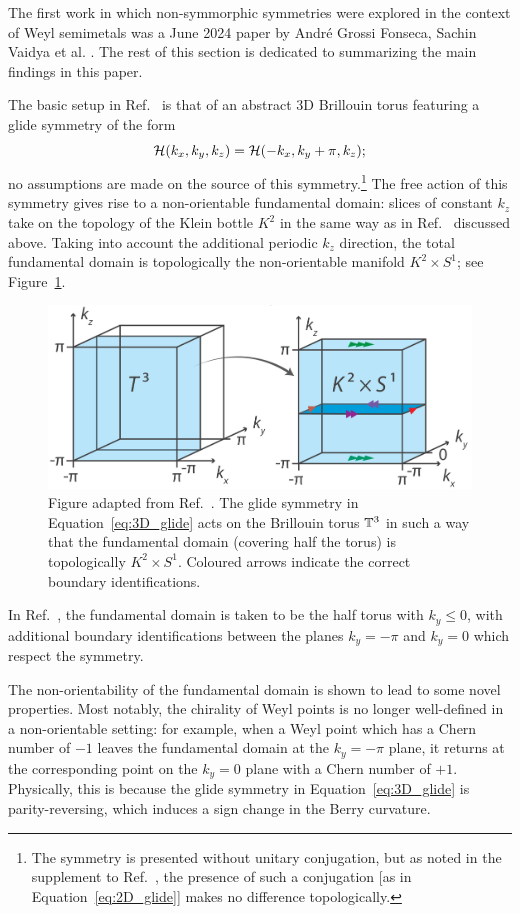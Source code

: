 The first work in which non-symmorphic symmetries were explored in the context of Weyl semimetals was a June 2024 paper by André Grossi Fonseca, Sachin Vaidya et al. \cite{Fonseca-Vaidya_nonorientable}. The rest of this section is dedicated to summarizing the main findings in this paper.

The basic setup in Ref.~\cite{Fonseca-Vaidya_nonorientable} is that of an abstract 3D Brillouin torus featuring a glide symmetry of the form
\begin{equation}\label{eq:3D_glide}
	\mathcal{H}(k_x, k_y, k_z) = \mathcal{H}(-k_x, k_y + \pi, k_z);
\end{equation}
no assumptions are made on the source of this symmetry.\footnote{
	The symmetry is presented without unitary conjugation, but as noted in the supplement to Ref.~\cite{Fonseca-Vaidya_nonorientable}, the presence of such a conjugation [as in Equation~\eqref{eq:2D_glide}] makes no difference topologically.}
The free action of this symmetry gives rise to a non-orientable fundamental domain: slices of constant $k_z$ take on the topology of the Klein bottle $K^2$ in the same way as in Ref.~\cite{CYZ_Klein-gauge} discussed above. Taking into account the additional periodic $k_z$ direction, the total fundamental domain is topologically the non-orientable manifold $K^2\times S^1$; see Figure~\ref{fig:K2S1}.
\begin{figure}[htb!]
	\centering
	\includegraphics[width=.7\linewidth]{Images/K2S1}
	\caption{Figure adapted from Ref.~\cite{Fonseca-Vaidya_nonorientable}. The glide symmetry in Equation~\eqref{eq:3D_glide} acts on the Brillouin torus $\mathbb{T}^3$ in such a way that the fundamental domain (covering half the torus) is topologically $K^2\times S^1$. Coloured arrows indicate the correct boundary identifications.} %
	\label{fig:K2S1}
\end{figure}
In Ref.~\cite{Fonseca-Vaidya_nonorientable}, the fundamental domain is taken to be the half torus with $k_y\leq 0$, with additional boundary identifications between the planes $k_y=-\pi$ and $k_y=0$ which respect the symmetry.

The non-orientability of the fundamental domain is shown to lead to some novel properties. Most notably, the chirality of Weyl points is no longer well-defined in a non-orientable setting: for example, when a Weyl point which has a Chern number of $-1$ leaves the fundamental domain at the $k_y=-\pi$ plane, it returns at the corresponding point on the $k_y=0$ plane with a Chern number of $+1$. Physically, this is because the glide symmetry in Equation~\eqref{eq:3D_glide} is parity-reversing, which induces a sign change in the Berry curvature.

